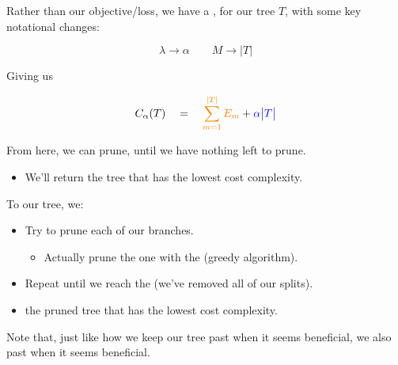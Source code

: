         \begin{notation}
            Rather than our objective/loss, we have a , for our tree $T$, with some key notational changes:

            \begin{equation*}
                \lambda \to \alpha \qquad M \to \big|T\big|
            \end{equation*}

            Giving us

            \begin{equation*}
                C_{\alpha}(T) \quad = \quad \textcolor{orange}{\sum_{m=1}^{|T|} E_m} + \textcolor{blue}{\alpha \big|T\big|}
            \end{equation*}
        \end{notation}


        From here, we can  prune, until we have nothing left to prune.

        \begin{itemize}
            \item We'll return the tree that has the lowest cost complexity.\\
        \end{itemize}

        \begin{concept}
            To  our tree, we:

            \begin{itemize}
                \item Try to prune each of our  branches.
                    \begin{itemize}
                        \item Actually prune the one with the  (greedy algorithm).
                    \end{itemize}
                \item Repeat until we reach the  (we've removed all of our splits).

                \item {} the pruned tree that has the lowest cost complexity.
            \end{itemize}
        \end{concept}

        Note that, just like how we keep  our tree past when it seems beneficial, we also  past when it seems beneficial.

